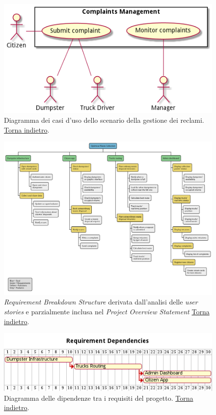 \begin{figure}[H]
    \centering
    \includegraphics[width=\textwidth]{../img/complaints-use-cases.pm}
    \caption{Diagramma dei casi d'uso dello scenario della gestione dei reclami. \hyperlink{back:complaints-use-cases}{Torna indietro}.}
    \label{fig:complaints-use-cases}
\end{figure}

\begin{figure}[H]
    \centering
    \includegraphics[width=\textwidth]{../img/requirement-breakdown-structure.pm}
    \caption{\textit{Requirement Breakdown Structure} derivata dall'analisi delle \textit{user stories} e parzialmente inclusa nel \textit{Project Overview Statement}   \hyperlink{back:requirement-breakdown-structure}{Torna indietro}.}
    \label{fig:requirement-breakdown-structure}
\end{figure}

\begin{figure}[H]
    \centering
    \includegraphics[width=\textwidth]{../img/gantt-requirements-dependencies.pm}
    \caption{Diagramma delle dipendenze tra i requisiti del progetto. \hyperlink{back:gantt-requirements-dependencies}{Torna indietro}.}
    \label{fig:gantt-requirements-dependencies}
\end{figure}

